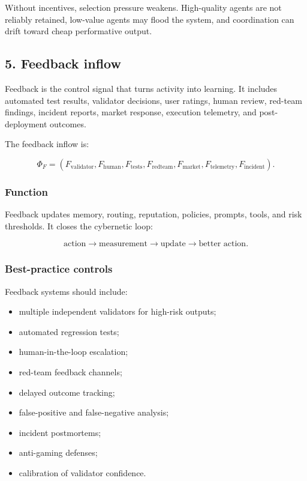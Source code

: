 Without incentives, selection pressure weakens. High-quality agents are
not reliably retained, low-value agents may flood the system, and
coordination can drift toward cheap performative output.

\subsection{5. Feedback inflow}\label{feedback-inflow}

Feedback is the control signal that turns activity into learning. It
includes automated test results, validator decisions, user ratings,
human review, red-team findings, incident reports, market response,
execution telemetry, and post-deployment outcomes.

The feedback inflow is:

\[
\Phi_F=(F_{\text{validator}},F_{\text{human}},F_{\text{tests}},F_{\text{redteam}},F_{\text{market}},F_{\text{telemetry}},F_{\text{incident}}).
\]

\subsubsection{Function}\label{function-4}

Feedback updates memory, routing, reputation, policies, prompts, tools,
and risk thresholds. It closes the cybernetic loop:

\[
\text{action}\rightarrow\text{measurement}\rightarrow\text{update}\rightarrow\text{better action}.
\]

\subsubsection{Best-practice controls}\label{best-practice-controls-4}

Feedback systems should include:

\begin{itemize}
\tightlist
\item
  multiple independent validators for high-risk outputs;
\item
  automated regression tests;
\item
  human-in-the-loop escalation;
\item
  red-team feedback channels;
\item
  delayed outcome tracking;
\item
  false-positive and false-negative analysis;
\item
  incident postmortems;
\item
  anti-gaming defenses;
\item
  calibration of validator confidence.
\end{itemize}

